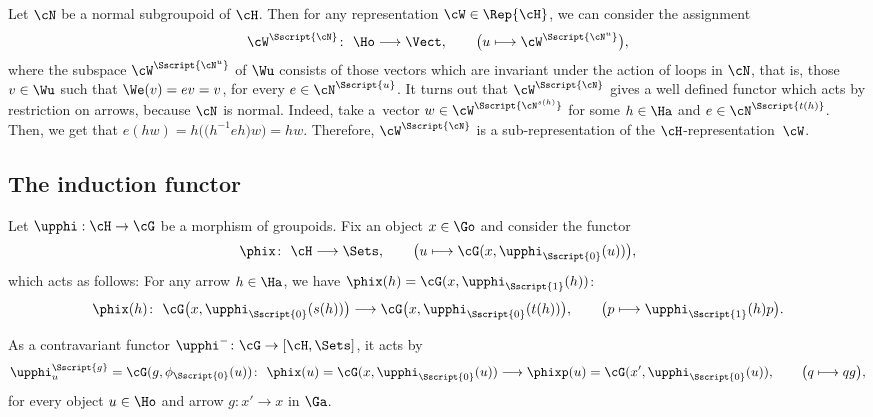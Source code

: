 \begin{Remark}\label{rem:WN} Let $\cN$ be a normal subgroupoid of $\cH$. Then for any representation $\cW \in \Rep{\cH}$, we can consider the assignment
\begin{gather*}
\cW^{\Sscript{\cN}}\colon \ \Ho \longrightarrow \Vect, \qquad \big( u \longmapsto \cW^{\Sscript{\cN^u}} \big),
\end{gather*}
where the subspace $\cW^{\Sscript{\cN^u}}$ of $\Wu$ consists of those vectors which are invariant under the action of loops in $\cN$, that is, those $v \in \Wu$ such that $\We(v)=e v=v$, for every $e \in \cN^{\Sscript{u}}$. It turns out that $\cW^{\Sscript{\cN}}$ gives a well defined functor which acts by restriction on arrows, because $\cN$ is normal. Indeed, take a~vector $w \in \cW^{\Sscript{\cN^{s(h)}}}$ for some $h \in \Ha$ and $e \in \cN^{\Sscript{t(h)}}$. Then, we get that $e (h w)= h \big(\big(h^{-1}eh\big)w \big)=h w$. Therefore, $\cW^{\Sscript{\cN}}$ is a sub-representation of the $\cH$-representation~$\cW$.
\end{Remark}

\subsection{The induction functor}\label{ssec:Ind}
Let $\upphi: \cH \to \cG$ be a morphism of groupoids. Fix an object $x \in \Go$ and consider the functor
\begin{gather*}
\phix\colon \ \cH \longrightarrow \Sets, \qquad \big( u \longmapsto \cG(x,\upphi_{\Sscript{0}}(u)) \big),
\end{gather*}
which acts as follows: For any arrow $h\in \Ha$, we have $\phix(h)=\cG(x, \upphi_{\Sscript{1}}(h))$:
\begin{gather}\label{Eq:Tartu}
\phix(h) \colon \ \cG\big(x, \upphi_{\Sscript{0}}(s(h)) \big) \longrightarrow \cG\big(x, \upphi_{\Sscript{0}}(t(h)) \big), \qquad \big( p \longmapsto \upphi_{\Sscript{1}}(h) p\big).
\end{gather}

As a contravariant functor $\upphi^{-}\colon \cG \to \left[\cH, \Sets\right]$, it acts by
\begin{gather}\label{Eq:Oslo}
\upphi^{\Sscript{g}}_u=\cG(g,\phi_{\Sscript{0}}(u))\colon \ \phix(u)=\cG(x,\upphi_{\Sscript{0}}(u) ) \longrightarrow \phixp(u)=\cG(x',\upphi_{\Sscript{0}}(u)), \qquad \big( q \longmapsto q g \big),
\end{gather}
for every object $u \in \Ho$ and arrow $g\colon x' \to x$ in $\Ga$.

